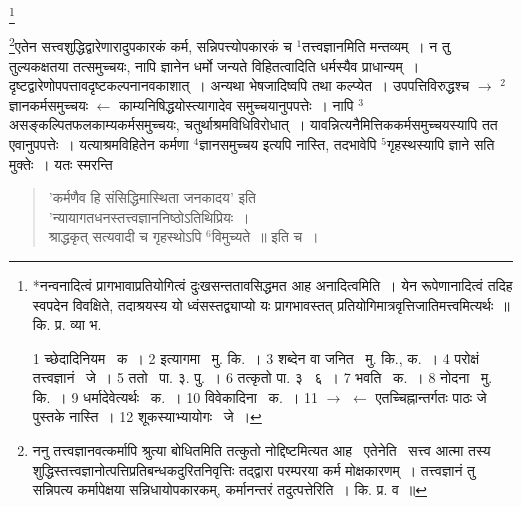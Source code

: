 \documentclass[11pt, openany]{book}
\newcommand\blfootnote[1]{%
 \begingroup
 \renewcommand\thefootnote{}\footnote{#1}%
 \addtocounter{footnote}{-1}%
 \endgroup
}
\begin{document}
\blfootnote{*नन्वनादित्वं प्रागभावाप्रतियोगित्वं दुःखसन्ततावसिद्धमत आह अनादित्वमिति~। येन रूपेणानादित्वं तदिह स्वपदेन विवक्षिते, तदाश्रयस्य यो ध्वंसस्तद्व्याप्यो यः प्रागभावस्तत् प्रतियोगिमात्रवृत्तिजातिमत्त्वमित्यर्थः~॥ कि. प्र. व्या भ.

1 च्छेदादिनियम  \textendash\ क~। 2 इत्यागमा  \textendash\ मु. कि.~। 3 शब्देन वा जनित  \textendash\ मु. कि., क.~। 4 परोक्षं तत्त्वज्ञानं  \textendash\ जे~। 5 ततो  \textendash\ पा. ३. पु.~। 6 तत्कृतो पा. ३  \textendash\ ६~। 7 भवति  \textendash\ क.~। 8 नोदना  \textendash\ मु. कि.~। 9 धर्मादेवेत्यर्थः  \textendash\ क.~। 10 विवेकादिना  \textendash\ क.~। 11 $\rightarrow$ $\leftarrow$ एतच्चिह्नान्तर्गतः पाठः जे पुस्तके नास्ति~। 12 शूकस्याभ्यायोगः  \textendash\ जे~।}

\newpage
\renewcommand{\thefootnote}{१}\footnote{ननु तत्त्वज्ञानवत्कर्मापि श्रुत्या बोधितमिति तत्कुतो नोद्दिष्टमित्यत आह \textendash\ एतेनेति \textendash\ सत्त्व आत्मा तस्य शुद्धिस्तत्त्वज्ञानोत्पत्तिप्रतिबन्धकदुरितनिवृत्तिः तद्द्वारा परम्परया कर्म मोक्षकारणम्~। तत्त्वज्ञानं तु सन्निपत्य कर्मापेक्षया सन्निधायोपकारकम्, कर्मानन्तरं तदुत्पत्तेरिति~। कि. प्र. व~॥}एतेन सत्त्वशुद्धिद्वारेणारादुपकारकं कर्म, सन्निपत्त्योपकारकं च ${}^1$तत्त्वज्ञानमिति मन्तव्यम्~। न तु तुल्यकक्षतया तत्समुच्चयः, नापि ज्ञानेन धर्मो जन्यते विहितत्वादिति धर्मस्यैव प्राधान्यम्~। दृष्टद्वारेणोपपत्तावदृष्टकल्पनानवकाशात्~। अन्यथा भेषजादिष्वपि तथा कल्प्येत~। उपपत्तिविरुद्धश्च $\rightarrow$ ${}^2$ज्ञानकर्मसमुच्चयः $\leftarrow$ काम्यनिषिद्धयोस्त्यागादेव समुच्चयानुपपत्तेः~। नापि ${}^3$असङ्कल्पितफलकाम्यकर्मसमुच्चयः, चतुर्थाश्रमविधिविरोधात्~। यावन्नित्यनैमित्तिककर्मसमुच्चयस्यापि तत एवानुपपत्तेः~। यत्याश्रमविहितेन कर्मणा ${}^4$ज्ञानसमुच्चय इत्यपि नास्ति, तदभावेपि ${}^5$गृहस्थस्यापि ज्ञाने सति मुक्तेः~। यतः स्मरन्ति \textendash\

\begin{quote}
{\qt 'कर्मणैव हि संसिद्धिमास्थिता जनकादय'} इति\\
{\qt 'न्यायागतधनस्तत्त्वज्ञाननिष्ठोऽतिथिप्रियः~।\\
श्राद्धकृत् सत्यवादी च गृहस्थोऽपि ${}^6$विमुच्यते~॥} इति च~।
\end{quote}
 
\end{document}
